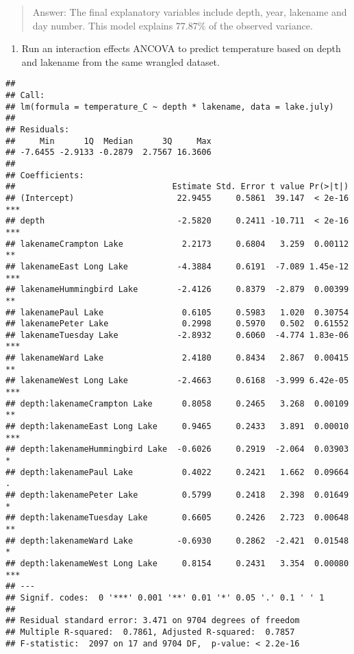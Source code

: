 \documentclass[]{article}
\newenvironment{Shaded}{\begin{snugshade}}{\end{snugshade}}
\newcommand{\CommentTok}[1]{\textcolor[rgb]{0.56,0.35,0.01}{\textit{#1}}}
\newcommand{\DataTypeTok}[1]{\textcolor[rgb]{0.13,0.29,0.53}{#1}}
\newcommand{\KeywordTok}[1]{\textcolor[rgb]{0.13,0.29,0.53}{\textbf{#1}}}
\newcommand{\NormalTok}[1]{#1}
\newcommand{\OperatorTok}[1]{\textcolor[rgb]{0.81,0.36,0.00}{\textbf{#1}}}
\newcommand{\StringTok}[1]{\textcolor[rgb]{0.31,0.60,0.02}{#1}}
\providecommand{\tightlist}{%
  \setlength{\itemsep}{0pt}\setlength{\parskip}{0pt}}
\begin{document}
\begin{quote}
Answer: The final explanatory variables include depth, year, lakename
and day number. This model explains 77.87\% of the observed variance.
\end{quote}

\begin{enumerate}
\def\labelenumi{\arabic{enumi}.}
\setcounter{enumi}{5}
\tightlist
\item
  Run an interaction effects ANCOVA to predict temperature based on
  depth and lakename from the same wrangled dataset.
\end{enumerate}

\begin{Shaded}
\end{Shaded}

\begin{verbatim}
## 
## Call:
## lm(formula = temperature_C ~ depth * lakename, data = lake.july)
## 
## Residuals:
##     Min      1Q  Median      3Q     Max 
## -7.6455 -2.9133 -0.2879  2.7567 16.3606 
## 
## Coefficients:
##                                Estimate Std. Error t value Pr(>|t|)    
## (Intercept)                     22.9455     0.5861  39.147  < 2e-16 ***
## depth                           -2.5820     0.2411 -10.711  < 2e-16 ***
## lakenameCrampton Lake            2.2173     0.6804   3.259  0.00112 ** 
## lakenameEast Long Lake          -4.3884     0.6191  -7.089 1.45e-12 ***
## lakenameHummingbird Lake        -2.4126     0.8379  -2.879  0.00399 ** 
## lakenamePaul Lake                0.6105     0.5983   1.020  0.30754    
## lakenamePeter Lake               0.2998     0.5970   0.502  0.61552    
## lakenameTuesday Lake            -2.8932     0.6060  -4.774 1.83e-06 ***
## lakenameWard Lake                2.4180     0.8434   2.867  0.00415 ** 
## lakenameWest Long Lake          -2.4663     0.6168  -3.999 6.42e-05 ***
## depth:lakenameCrampton Lake      0.8058     0.2465   3.268  0.00109 ** 
## depth:lakenameEast Long Lake     0.9465     0.2433   3.891  0.00010 ***
## depth:lakenameHummingbird Lake  -0.6026     0.2919  -2.064  0.03903 *  
## depth:lakenamePaul Lake          0.4022     0.2421   1.662  0.09664 .  
## depth:lakenamePeter Lake         0.5799     0.2418   2.398  0.01649 *  
## depth:lakenameTuesday Lake       0.6605     0.2426   2.723  0.00648 ** 
## depth:lakenameWard Lake         -0.6930     0.2862  -2.421  0.01548 *  
## depth:lakenameWest Long Lake     0.8154     0.2431   3.354  0.00080 ***
## ---
## Signif. codes:  0 '***' 0.001 '**' 0.01 '*' 0.05 '.' 0.1 ' ' 1
## 
## Residual standard error: 3.471 on 9704 degrees of freedom
## Multiple R-squared:  0.7861, Adjusted R-squared:  0.7857 
## F-statistic:  2097 on 17 and 9704 DF,  p-value: < 2.2e-16
\end{verbatim}
\end{document}

